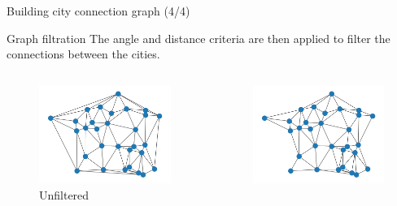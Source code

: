 \begin{frame}{Building city connection graph (4/4)}
    \begin{block}{Graph filtration}
        The angle and distance criteria are then applied to filter the connections between the cities.
    \end{block}
    \begin{columns}
        \begin{column}{0.3\textwidth}
            \begin{figure}
                \includegraphics[width=0.2\paperwidth]{images/road_detection/delaunay_big_cities_unfiltered.png}
                \caption{Unfiltered}
            \end{figure}
        \end{column}
        \begin{column}{0.3\textwidth}
            \begin{figure}
                \includegraphics[width=0.2\paperwidth]{images/road_detection/delaunay_big_cities_distance_filtered.png}

\end{figure}
\end{column}
\end{columns}
\end{frame}
